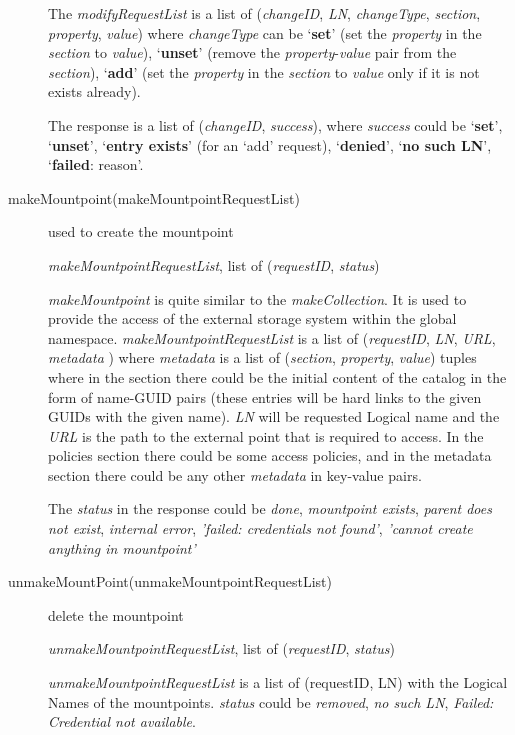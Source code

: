 \documentclass{book}
\begin{document}
\begin{description}
    The \emph{modifyRequestList} is a list of (\emph{changeID}, \emph{LN}, \emph{changeType}, \emph{section}, \emph{property}, \emph{value}) where \emph{changeType} can be `\textbf{set}' (set the \emph{property} in the \emph{section} to \emph{value}), `\textbf{unset}' (remove the \emph{property}-\emph{value} pair from the \emph{section}), `\textbf{add}' (set the \emph{property} in the \emph{section} to \emph{value} only if it is not exists already). 

    The response is a list of (\emph{changeID}, \emph{success}), where \emph{success} could be  `\textbf{set}', `\textbf{unset}', `\textbf{entry exists}' (for an `add' request), `\textbf{denied}', `\textbf{no such LN}', `\textbf{failed}: reason'.
   
    \item[makeMountpoint(makeMountpointRequestList)] used to create the mountpoint

    \emph{makeMountpointRequestList}, list of (\emph{requestID}, \emph{status})

    \emph{makeMountpoint} is quite similar to the \emph{makeCollection}. It is used to provide the access of the external storage system within the global namespace. \emph{makeMountpointRequestList} is a list of (\emph{requestID}, \emph{LN}, \emph{URL}, \emph{metadata} ) where \emph{metadata} is a list of (\emph{section}, \emph{property}, \emph{value}) tuples where in the section there could be the initial content of the catalog in the form of name-GUID pairs (these entries will be hard links to the given GUIDs with the given name). \emph{LN} will be requested Logical name and the \emph{URL} is the path to the external point that is required to access. In the policies section there could be some access policies, and in the metadata section there could be any other \emph{metadata} in key-value pairs. 

    The \emph{status} in the response could be \emph{done}, \emph{mountpoint exists}, \emph{parent does not exist}, \emph{internal error}, \emph{'failed: credentials not found'}, \emph{'cannot create anything in mountpoint'}

    \item[unmakeMountPoint(unmakeMountpointRequestList)] delete the mountpoint

    \emph{unmakeMountpointRequestList}, list of (\emph{requestID}, \emph{status})	

    \emph{unmakeMountpointRequestList} is a list of (requestID, LN) with the Logical Names of the mountpoints. \emph{status} could be \emph{removed}, \emph{no such LN}, \emph{Failed: Credential not available}. 


\end{description}
\end{document}
